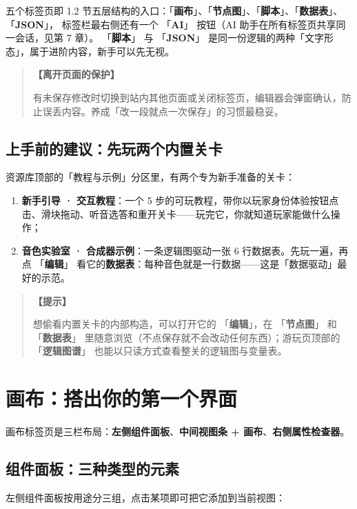 \documentclass[UTF8,a4paper,zihao=-4]{ctexart}
\newcommand{\ui}[1]{「\textbf{#1}」}  %
\newenvironment{tip}[1][提示]{%
  \begin{quote}\small\textbf{【#1】}\ignorespaces
}{\end{quote}}
\begin{document}
五个标签页即 1.2 节五层结构的入口：\ui{画布}、\ui{节点图}、\ui{脚本}、\ui{数据表}、\ui{JSON}，
标签栏最右侧还有一个 \ui{AI} 按钮（AI 助手在所有标签页共享同一会话，见第 7 章）。
\ui{脚本} 与 \ui{JSON} 是同一份逻辑的两种「文字形态」，属于进阶内容，新手可以先无视。

\begin{tip}[离开页面的保护]
有未保存修改时切换到站内其他页面或关闭标签页，编辑器会弹窗确认，防止误丢内容。养成「改一段就点一次保存」的习惯最稳妥。
\end{tip}

\subsection{上手前的建议：先玩两个内置关卡}

资源库顶部的「教程与示例」分区里，有两个专为新手准备的关卡：

\begin{enumerate}[nosep]
  \item \textbf{新手引导 · 交互教程}：一个 5 步的可玩教程，带你以玩家身份体验按钮点击、滑块拖动、听音选答和重开关卡——玩完它，你就知道玩家能做什么操作；
  \item \textbf{音色实验室 · 合成器示例}：一条逻辑图驱动一张 6 行数据表。先玩一遍，再点 \ui{编辑} 看它的\textbf{数据表}：每种音色就是一行数据——这是「数据驱动」最好的示范。
\end{enumerate}

\begin{tip}
想偷看内置关卡的内部构造，可以打开它的 \ui{编辑}，在 \ui{节点图} 和 \ui{数据表} 里随意浏览（不点保存就不会改动任何东西）；游玩页顶部的 \ui{逻辑图谱} 也能以只读方式查看整关的逻辑图与变量表。
\end{tip}

\section{画布：搭出你的第一个界面}

画布标签页是三栏布局：\textbf{左侧组件面板}、\textbf{中间视图条 + 画布}、\textbf{右侧属性检查器}。

\subsection{组件面板：三种类型的元素}

左侧组件面板按用途分三组，点击某项即可把它添加到当前视图：
\end{document}
